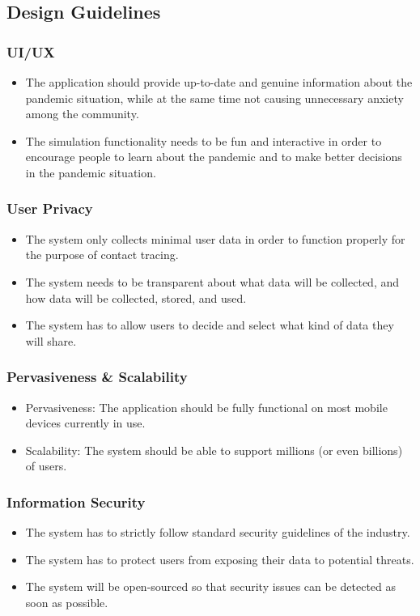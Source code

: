   \subsection{Design Guidelines}
    \subsubsection{UI/UX}
      \begin{itemize}
        \item The application should provide up-to-date and genuine information about the pandemic situation, while at the same time not causing unnecessary anxiety among the community.
        \item The simulation functionality needs to be fun and interactive in order to encourage people to learn about the pandemic and to make better decisions in the pandemic situation.
      \end{itemize}

    \subsubsection{User Privacy}
      \begin{itemize}
        \item The system only collects minimal user data in order to function properly for the purpose of contact tracing.
        \item The system needs to be transparent about what data will be collected, and how data will be collected, stored, and used.
        \item The system has to allow users to decide and select what kind of data they will share.
      \end{itemize}
    
    \subsubsection{Pervasiveness \& Scalability}
      \begin{itemize}
        \item Pervasiveness: The application should be fully functional on most mobile devices currently in use.
        \item Scalability: The system should be able to support millions (or even billions) of users.
      \end{itemize}
    
    \subsubsection{Information Security}
      \begin{itemize}
        \item The system has to strictly follow standard security guidelines of the industry.
        \item The system has to protect users from exposing their data to potential threats.
        \item The system will be open-sourced so that security issues can be detected as soon as possible.
      \end{itemize}

